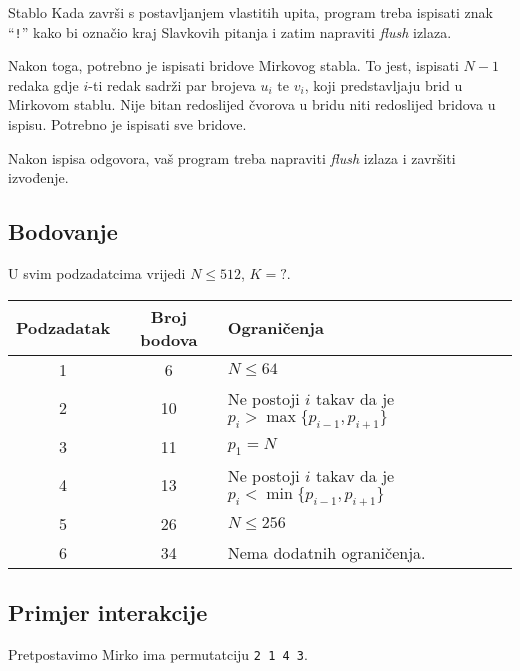 \begin{statement}[
  problempoints=100,
  timelimit=1 sekunda,
  memorylimit=512 MiB,
]{Stablo}
Kada završi s postavljanjem vlastitih upita, program treba ispisati znak ``\texttt{!}'' kako bi označio kraj Slavkovih pitanja i zatim napraviti \textit{flush} izlaza.

Nakon toga, potrebno je ispisati bridove Mirkovog stabla. To jest, ispisati $N - 1$ redaka gdje $i$-ti redak sadrži par brojeva $u_i$ te $v_i$, koji predstavljaju brid u Mirkovom stablu. Nije bitan redoslijed čvorova u bridu niti redoslijed bridova u ispisu. Potrebno je ispisati sve bridove.

Nakon ispisa odgovora, vaš program treba napraviti \textit{flush} izlaza i završiti izvođenje.

\subsection*{Bodovanje}

U svim podzadatcima vrijedi $N \leq 512$, $K = ?$.

{\renewcommand{\arraystretch}{1.4}
  \setlength{\tabcolsep}{6pt}
  \begin{tabular}{ccl}
   Podzadatak & Broj bodova & Ograničenja \\ \midrule
   	1 & 6 & $N \leq 64$ \\
    2 & 10 & Ne postoji $i$ takav da je $p_i > \max\{p_{i - 1}, p_{i + 1}\}$ \\
    3 & 11 & $p_1 = N$ \\
    4 & 13 & Ne postoji $i$ takav da je $p_i < \min\{p_{i - 1}, p_{i + 1}\}$ \\
    5 & 26 & $N \leq 256$ \\
    6 & 34 & Nema dodatnih ograničenja. \\
\end{tabular}}

\subsection*{Primjer interakcije}

Pretpostavimo Mirko ima permutatciju \texttt{2 1 4 3}.


\end{statement}
